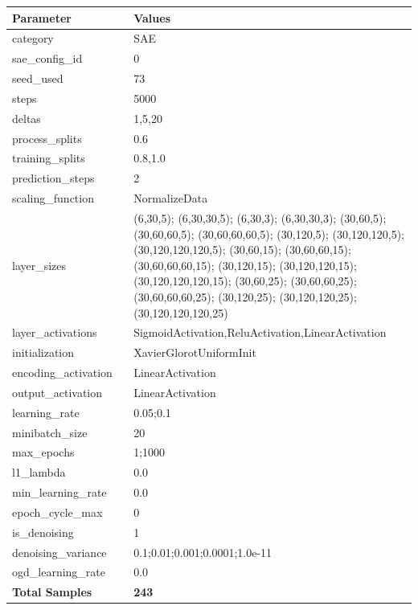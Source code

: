 \documentclass[a4paper,11pt,oneside]{article}
\theoremstyle{plain}
\theoremstyle{definition}
\begin{document}
	\begin{longtable}[H]{|p{0.3\linewidth}|p{0.7\linewidth}|} \hline 			\rowcolor{beaublue}\textbf{Parameter} &\textbf{Values} \\\hline{category} & {SAE} \\\hline
		{sae\_config\_id} & {0} \\\hline
		{seed\_used} & {73} \\\hline
		{steps} & {5000} \\\hline
		{deltas} & {1,5,20} \\\hline
		{process\_splits} & {0.6} \\\hline
		{training\_splits} & {0.8,1.0} \\\hline
		{prediction\_steps} & {2} \\\hline
		{scaling\_function} & {NormalizeData} \\\hline
		{layer\_sizes} & {(6,30,5); (6,30,30,5); (6,30,3); (6,30,30,3); (30,60,5); (30,60,60,5); (30,60,60,60,5); (30,120,5); (30,120,120,5); (30,120,120,120,5); (30,60,15); (30,60,60,15); (30,60,60,60,15); (30,120,15); (30,120,120,15); (30,120,120,120,15); (30,60,25); (30,60,60,25); (30,60,60,60,25); (30,120,25); (30,120,120,25); (30,120,120,120,25)} \\\hline
		{layer\_activations} & {SigmoidActivation,ReluActivation,LinearActivation} \\\hline
		{initialization} & {XavierGlorotUniformInit} \\\hline
		{encoding\_activation} & {LinearActivation} \\\hline
		{output\_activation} & {LinearActivation} \\\hline
		{learning\_rate} & {0.05;0.1} \\\hline
		{minibatch\_size} & {20} \\\hline
		{max\_epochs} & {1;1000} \\\hline
		{l1\_lambda} & {0.0} \\\hline
		{min\_learning\_rate} & {0.0} \\\hline
		{epoch\_cycle\_max} & {0} \\\hline
		{is\_denoising} & {1} \\\hline
		{denoising\_variance} & {0.1;0.01;0.001;0.0001;1.0e-11} \\\hline
		{ogd\_learning\_rate} & {0.0} \\\hline
		{\textbf{Total Samples}} & {\textbf{243}} \\\hline
	\end{longtable}
	
\end{document}

